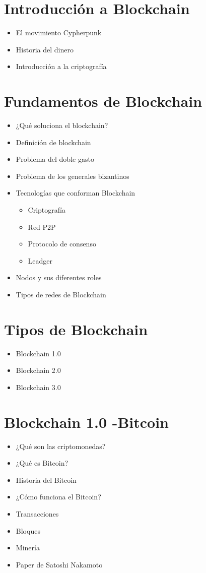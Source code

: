 \documentclass{lib/temarioptc}
\begin{document}
\vspace*{2mm}
\selectfont


\section{Introducción a Blockchain}
\begin{itemize}
	\item El movimiento Cypherpunk
	\item Historia del dinero
	\item Introducción a la criptografía
\end{itemize}
\section{Fundamentos de Blockchain}
\begin{itemize}
	\item ¿Qué soluciona el blockchain?
	\item Definición de blockchain
	\item Problema del doble gasto
	\item Problema de los generales bizantinos
	\item Tecnologías que conforman Blockchain
	\begin{itemize}
		\item Criptografía
		\item Red P2P
		\item Protocolo de consenso
		\item Leadger
	\end{itemize}
	\item Nodos y sus diferentes roles
	\item Tipos de redes de Blockchain
\end{itemize}
\section{Tipos de Blockchain}
\begin{itemize}
	\item Blockchain 1.0
	\item Blockchain 2.0
	\item Blockchain 3.0
\end{itemize}\newpage

\section{Blockchain 1.0 -Bitcoin}
\begin{itemize}
	\item ¿Qué son las criptomonedas?
	\item ¿Qué es Bitcoin?
	\item Historia del Bitcoin
	\item ¿Cómo funciona el Bitcoin?
	\item Transacciones
	\item Bloques
	\item Minería
	\item Paper de Satoshi Nakamoto
\end{itemize}
\end{document}
